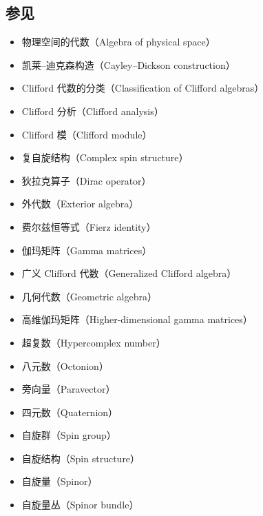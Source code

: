 \subsection{参见}
\begin{itemize}
\item 物理空间的代数（Algebra of physical space）
\item 凯莱–迪克森构造（Cayley–Dickson construction）
\item Clifford 代数的分类（Classification of Clifford algebras）
\item Clifford 分析（Clifford analysis）
\item Clifford 模（Clifford module）
\item 复自旋结构（Complex spin structure）
\item 狄拉克算子（Dirac operator）
\item 外代数（Exterior algebra）
\item 费尔兹恒等式（Fierz identity）
\item 伽玛矩阵（Gamma matrices）
\item 广义 Clifford 代数（Generalized Clifford algebra）
\item 几何代数（Geometric algebra）
\item 高维伽玛矩阵（Higher-dimensional gamma matrices）
\item 超复数（Hypercomplex number）
\item 八元数（Octonion）
\item 旁向量（Paravector）
\item 四元数（Quaternion）
\item 自旋群（Spin group）
\item 自旋结构（Spin structure）
\item 自旋量（Spinor）
\item 自旋量丛（Spinor bundle）
\end{itemize}
